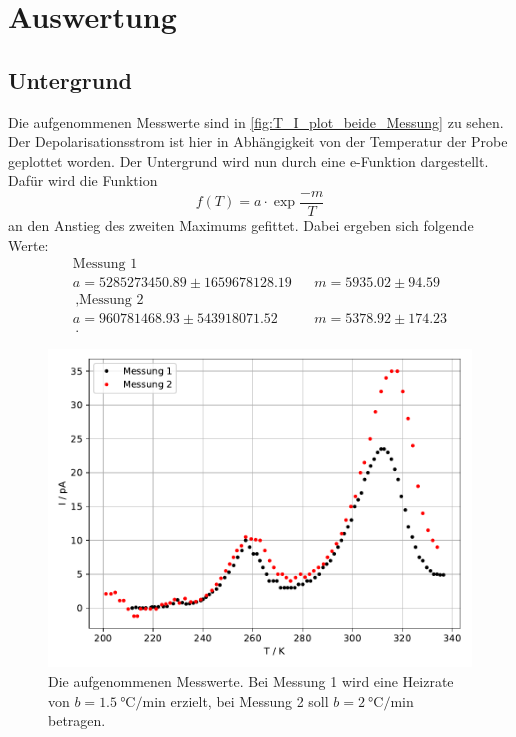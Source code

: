 \section{Auswertung}
\label{sec:Auswertung}

\subsection{Untergrund}

Die aufgenommenen Messwerte sind in \autoref{fig:T_I_plot_beide_Messung} zu sehen.
Der Depolarisationsstrom ist hier in Abhängigkeit von der Temperatur der Probe geplottet worden.
Der Untergrund wird nun durch eine e-Funktion dargestellt.
Dafür wird die Funktion
\begin{equation*}
  f(T) = a \cdot \exp{\frac{-m}{T}}
\end{equation*}
an den Anstieg des zweiten Maximums gefittet.
Dabei ergeben sich folgende Werte:
\begin{align*}
  \text{Messung 1}\\
  a = 5285273450.89 \pm 1659678128.19 &&  m = 5935.02 \pm 94.59 \\ \, ,
  \text{Messung 2}\\
  a = 960781468.93 \pm 543918071.52 &&  m = 5378.92 \pm 174.23 \\ \, .
\end{align*}


\begin{figure}
  \centering
  \includegraphics{build/plot.pdf}
  \caption{Die aufgenommenen Messwerte. Bei Messung 1 wird eine Heizrate von $b = \SI{1.5}{\celsius\per\minute}$ erzielt, 
  bei Messung 2 soll $b = \SI{2}{\celsius\per\minute}$ betragen.}
  \label{fig:T_I_plot_beide_Messung}
\end{figure} %

